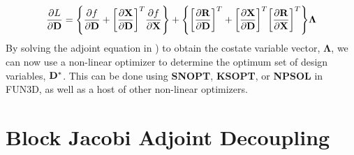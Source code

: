\begin{equation}
  \frac{\partial L}{\partial \mathbf D}=
  \Bigg\{\frac{\partial f}{\partial \mathbf D}+\bigg[\frac{\partial \mathbf X}{\partial
  \mathbf D}\bigg]^T \frac{\partial f}{\partial \mathbf X}\Bigg\}
  +\Bigg\{\bigg[\frac{\partial \mathbf R}{\partial \mathbf D}\bigg]^T
  +\bigg[\frac{\partial \mathbf X}{\partial \mathbf D}\bigg]^T\bigg[\frac{\partial
  \mathbf R}{\partial \mathbf X}\bigg]^T\Bigg\}\mathbf{\Lambda}
  \label{obj_function}
\end{equation}
By solving the adjoint equation in ) to obtain the costate
variable vector, $\mathbf{\Lambda}$, we can now use a non-linear optimizer to
determine the optimum set of design variables, $\mathbf D^*$. This can be done using
{\bf SNOPT\cite{snopt-manual}}, {\bf KSOPT\cite{KSOPT}}, or {\bf
  NPSOL\cite{npsol-manual}} in FUN3D, as well as a host of other non-linear
optimizers.

\section{Block Jacobi Adjoint Decoupling}

